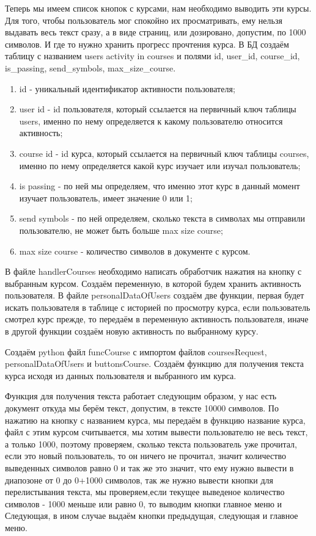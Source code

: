 \documentclass[12pt, oldlfont, amsfonts]{report}
\begin{document}
Теперь мы имеем список кнопок с курсами, нам необходимо выводить эти курсы. Для того, чтобы пользователь мог спокойно их просматривать, ему нельзя выдавать весь текст сразу, а в виде страниц, или дозировано, допустим, по 1000 символов. И где то нужно хранить прогресс прочтения курса. В БД создаём таблицу с названием { users activity in courses} и полями { id},{ user\_id}, { course\_id}, { is\_passing}, { send\_symbols}, { max\_size\_course}.
\begin{enumerate}
\item { id} - уникальный идентификатор активности пользователя;
\item { user id} - id пользователя, который ссылается на первичный ключ таблицы { users}, именно по нему определяется к какому пользователю относится активность;
\item { course id} - id курса, который ссылается на первичный ключ таблицы { courses}, именно по нему определяется какой курс изучает или изучал пользователь;
\item { is passing} - по ней мы определяем, что именно этот курс в данный момент изучает пользователь, имеет значение 0 или 1;
\item { send symbols} - по ней определяем, сколько текста в символах мы отправили пользователю, не может быть больше { max size course};
\item { max size course} - количество символов в документе с курсом.
\end{enumerate}	
В файле { handlerCourses} необходимо написать обработчик нажатия на кнопку с выбранным курсом. Создаём переменную, в которой будем хранить активность пользователя. В файле { personalDataOfUsers} создаём две функции, первая будет искать пользователя в таблице с историей по просмотру курса, если пользователь смотрел курс прежде, то передаём в переменную активность пользователя, иначе в другой функции создаём новую активность по выбранному курсу. 

Создаём python файл { funcCourse} с импортом файлов { coursesRequest}, { personalDataOfUsers} и { buttonsCourse}.
Создаём функцию для получения текста курса исходя из данных пользователя и выбранного им курса.

Функция для получения текста работает следующим образом, у нас есть документ откуда мы берём текст, допустим, в тексте 10000 символов. По нажатию на кнопку с названием курса, мы передаём в функцию название курса, файл с этим курсом считывается, мы хотим вывести пользователю не весь текст, а только 1000, поэтому проверяем, сколько текста пользователь уже прочитал, если это новый пользователь, то он ничего не прочитал, значит количество выведенных символов равно 0 и так же это значит, что ему нужно вывести в диапозоне от 0 до 0+1000 символов, так же нужно вывести кнопки для перелистывания текста, мы проверяем,если текущее выведеное количество символов - 1000 меньше или равно 0, то выводим кнопки { главное меню} и { Следующая}, в ином случае выдаём кнопки { предыдущая}, { следующая} и { главное меню}.
\end{document}
